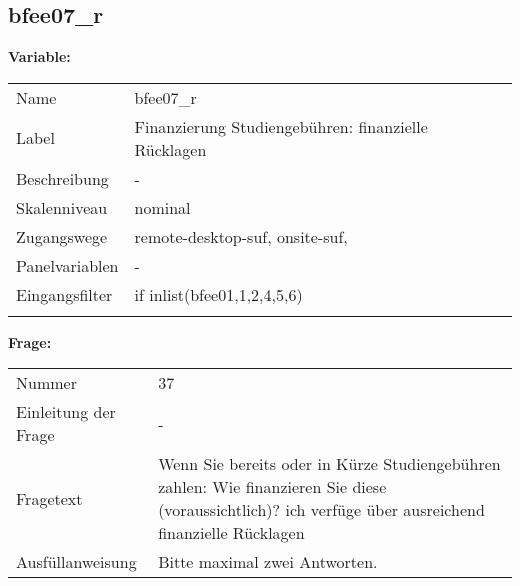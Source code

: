 	
	
	\subsection{bfee07\_r}
	\label{subSection:bfee07_r}

	\noindent\textbf{Variable:}\\
		\begin{tabular}{lL{11.3cm}}
			\label{tableVariable:bfee07_r}
			Name & bfee07\_r \\
			Label & Finanzierung Studiengebühren: finanzielle Rücklagen \\
			Beschreibung & - \\
			Skalenniveau & nominal \\
			Zugangswege &
				remote-desktop-suf,
				onsite-suf,
 \\
			Panelvariablen & -
			 \\
			Eingangsfilter & if inlist(bfee01,1,2,4,5,6) \\
 \\
		\end{tabular}

		\vspace*{1 cm}
		\noindent\textbf{Frage:}\\
		\begin{tabular}{lL{11.3cm}}
			\label{tableQuestion:bfee07_r}
			Nummer & 37 \\
			Einleitung der Frage & - \\
			Fragetext & Wenn Sie bereits oder in Kürze Studiengebühren zahlen: Wie finanzieren Sie diese (voraussichtlich)?
ich verfüge über ausreichend finanzielle Rücklagen \\
			Ausfüllanweisung & Bitte maximal zwei Antworten. \\
		\end{tabular}





